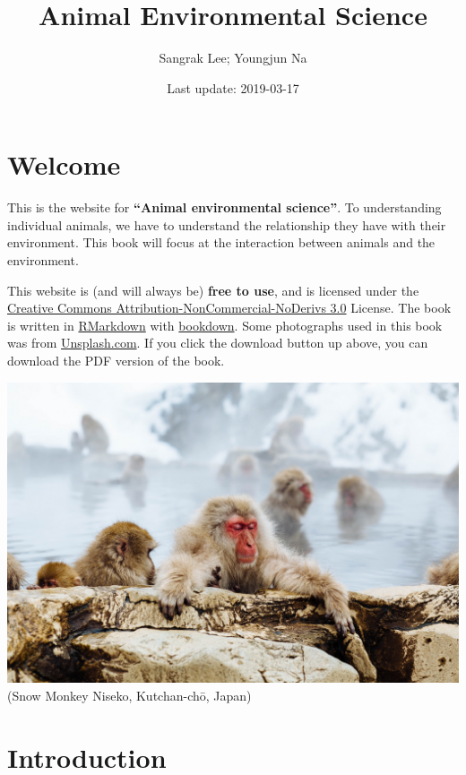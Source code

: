 \documentclass[]{book}
\title{Animal Environmental Science}
\author{Sangrak Lee; Youngjun Na}
\date{Last update: 2019-03-17}
\begin{document}
\maketitle

{
\setcounter{tocdepth}{1}
\tableofcontents
}
\chapter*{Welcome}\label{welcome}

This is the website for \textbf{``Animal environmental science''}. To
understanding individual animals, we have to understand the relationship
they have with their environment. This book will focus at the
interaction between animals and the environment.

This website is (and will always be) \textbf{free to use}, and is
licensed under the
\href{http://creativecommons.org/licenses/by-nc-nd/3.0/us/}{Creative
Commons Attribution-NonCommercial-NoDerivs 3.0} License. The book is
written in \href{https://rmarkdown.rstudio.com}{RMarkdown} with
\href{https://bookdown.org}{bookdown}. Some photographs used in this
book was from \href{https://unsplash.com/}{Unsplash.com}. If you click
the download button up above, you can download the PDF version of the
book.

\includegraphics{figures/monkey.jpeg}\\
(Snow Monkey Niseko, Kutchan-chō, Japan)

\chapter{Introduction}\label{intro}
\end{document}
